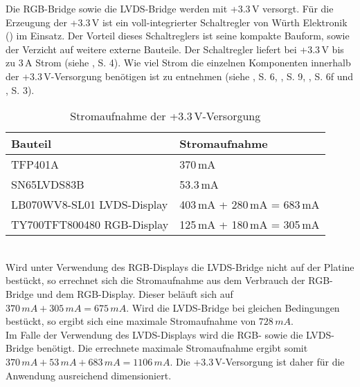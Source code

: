 Die RGB-Bridge  sowie die LVDS-Bridge  werden mit +3.3\,V versorgt. Für die Erzeugung der +3.3\,V ist ein voll-integrierter Schaltregler von Würth Elektronik () im Einsatz. Der Vorteil dieses Schaltreglers ist seine kompakte Bauform, sowie der Verzicht auf weitere externe Bauteile. Der Schaltregler liefert bei +3.3\,V bis zu 3\,A Strom (siehe \cite{Wuerth2013}, S. 4). Wie viel Strom die einzelnen Komponenten innerhalb der +3.3\,V-Versorgung benötigen ist  zu entnehmen (siehe \cite{TI2011}, S. 6, \cite{TI2011b}, S. 9, \cite{LG2012}, S. 6f und \cite{Techtoys2012}, S. 3).
\begin{table}[h]
\begin{tabular}{|p{8.5cm}|p{5cm}|}\hline
\rowcolor{TableBackgroundColor} 
   \textbf{Bauteil} & \textbf{Stromaufnahme} \\ \hline
    TFP401A & 370\,mA\\ \hline
	SN65LVDS83B & 53.3\,mA\\ \hline
	LB070WV8-SL01 LVDS-Display & 403\,mA + 280\,mA = 683\,mA\\  \hline
	TY700TFT800480 RGB-Display & 125\,mA + 180\,mA = 305\,mA\\ \hline
\end{tabular}
\caption{Stromaufnahme der +3.3\,V-Versorgung}
\label{tab:3_3v_strom}
\end{table} \\
Wird unter Verwendung des RGB-Displays die LVDS-Bridge nicht auf der Platine bestückt, so errechnet sich die Stromaufnahme aus dem Verbrauch der RGB-Bridge und dem RGB-Display. Dieser beläuft sich auf  $370\,mA + 305\,mA = 675\,mA$. Wird die LVDS-Bridge bei gleichen Bedingungen bestückt, so ergibt sich eine maximale Stromaufnahme von $728\,mA$.\\
Im Falle der Verwendung des LVDS-Displays wird die RGB- sowie die LVDS-Bridge benötigt. Die errechnete maximale Stromaufnahme ergibt somit $370\,mA + 53\,mA + 683\,mA = 1106\,mA$. Die +3.3\,V-Versorgung ist daher für die Anwendung ausreichend dimensioniert.\newline


